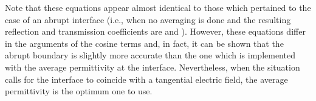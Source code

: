 Note that these equations appear almost identical to those
which pertained to the case of an abrupt interface (i.e., when no
averaging is done and the resulting reflection and transmission
coefficients are  and
).  However, these equations differ in the
arguments of the cosine terms and, in fact, it can be shown that the
abrupt boundary is slightly more accurate than the one which is
implemented with the average permittivity at the interface.
Nevertheless, when the situation calls for the interface to coincide
with a tangential electric field, the average permittivity is the
optimum one to use.

